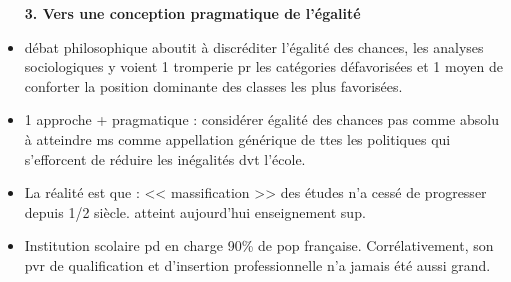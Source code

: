 \documentclass[12pt]{article}
\begin{document}
\begin{itemize}
\textbf{3. Vers une conception pragmatique de l'égalité}\\

\item débat philosophique aboutit à discréditer l'égalité des chances, les analyses sociologiques y voient 1 tromperie pr les catégories défavorisées et 1 moyen de conforter la position dominante des classes les plus favorisées. \\

\item 1 approche + pragmatique : considérer égalité des chances pas comme absolu à atteindre ms comme appellation générique de ttes les politiques qui s'efforcent de réduire les inégalités dvt l'école.\\

\item La réalité est que : << massification >> des études n'a cessé de progresser depuis 1/2 siècle. atteint aujourd'hui enseignement sup.


\vspace{0.5cm}


\item Institution scolaire pd en charge 90\% de pop française. Corrélativement, son pvr de qualification et d'insertion professionnelle n'a jamais été aussi grand.\\

\end{itemize}
\end{document}
